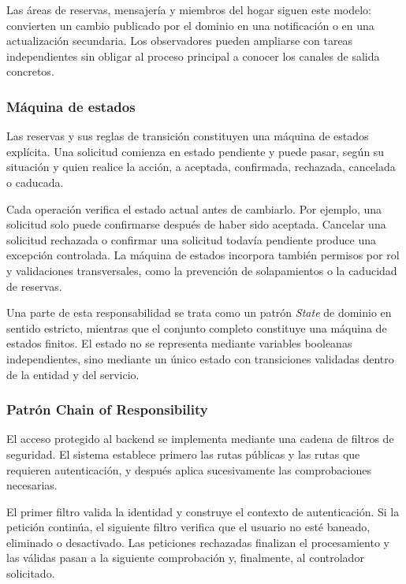 Las áreas de reservas, mensajería y miembros del hogar siguen este modelo: convierten un cambio publicado por el dominio en una notificación o en una actualización secundaria. Los observadores pueden ampliarse con tareas independientes sin obligar al proceso principal a conocer los canales de salida concretos.

\subsubsection{Máquina de estados}

Las reservas y sus reglas de transición constituyen una máquina de estados explícita. Una solicitud comienza en estado pendiente y puede pasar, según su situación y quien realice la acción, a aceptada, confirmada, rechazada, cancelada o caducada.

Cada operación verifica el estado actual antes de cambiarlo. Por ejemplo, una solicitud solo puede confirmarse después de haber sido aceptada. Cancelar una solicitud rechazada o confirmar una solicitud todavía pendiente produce una excepción controlada. La máquina de estados incorpora también permisos por rol y validaciones transversales, como la prevención de solapamientos o la caducidad de reservas.

Una parte de esta responsabilidad se trata como un patrón \emph{State} de dominio en sentido estricto, mientras que el conjunto completo constituye una máquina de estados finitos. El estado no se representa mediante variables booleanas independientes, sino mediante un único estado con transiciones validadas dentro de la entidad y del servicio.

\subsubsection{Patrón Chain of Responsibility}

El acceso protegido al backend se implementa mediante una cadena de filtros de seguridad. El sistema establece primero las rutas públicas y las rutas que requieren autenticación, y después aplica sucesivamente las comprobaciones necesarias.

El primer filtro valida la identidad y construye el contexto de autenticación. Si la petición continúa, el siguiente filtro verifica que el usuario no esté baneado, eliminado o desactivado. Las peticiones rechazadas finalizan el procesamiento y las válidas pasan a la siguiente comprobación y, finalmente, al controlador solicitado.

